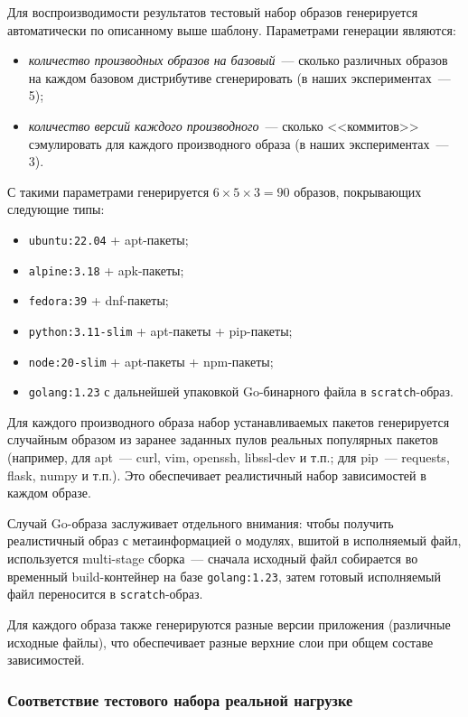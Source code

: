 Для воспроизводимости результатов тестовый набор образов генерируется автоматически по описанному выше шаблону. Параметрами генерации являются:

\begin{itemize}
\item \textit{количество производных образов на базовый}~--- сколько различных образов на каждом базовом дистрибутиве сгенерировать (в наших экспериментах~--- 5);
\item \textit{количество версий каждого производного}~--- сколько <<коммитов>> сэмулировать для каждого производного образа (в наших экспериментах~--- 3).
\end{itemize}

С такими параметрами генерируется $6 \times 5 \times 3 = 90$ образов, покрывающих следующие типы:

\begin{itemize}
\item \texttt{ubuntu:22.04} + apt-пакеты;
\item \texttt{alpine:3.18} + apk-пакеты;
\item \texttt{fedora:39} + dnf-пакеты;
\item \texttt{python:3.11-slim} + apt-пакеты + pip-пакеты;
\item \texttt{node:20-slim} + apt-пакеты + npm-пакеты;
\item \texttt{golang:1.23} с дальнейшей упаковкой Go-бинарного файла в \texttt{scratch}-образ.
\end{itemize}

Для каждого производного образа набор устанавливаемых пакетов генерируется случайным образом из заранее заданных пулов реальных популярных пакетов (например, для apt~--- curl, vim, openssh, libssl-dev и т.п.; для pip~--- requests, flask, numpy и т.п.). Это обеспечивает реалистичный набор зависимостей в каждом образе.

Случай Go-образа заслуживает отдельного внимания: чтобы получить реалистичный образ с метаинформацией о модулях, вшитой в исполняемый файл, используется multi-stage сборка~--- сначала исходный файл собирается во временный build-контейнер на базе \texttt{golang:1.23}, затем готовый исполняемый файл переносится в \texttt{scratch}-образ.

Для каждого образа также генерируются разные версии приложения (различные исходные файлы), что обеспечивает разные верхние слои при общем составе зависимостей.

\subsubsection{Соответствие тестового набора реальной нагрузке}

